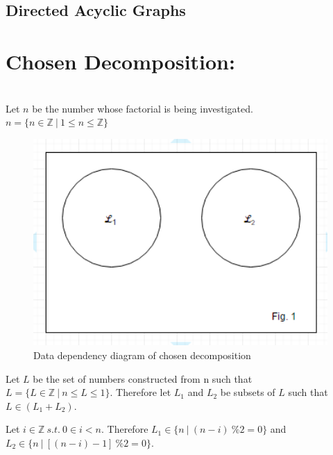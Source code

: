 \documentclass[11pt]{article}
\begin{document}
\begin{page}

\clearpage
\setcounter{page}{1}

\section{Directed Acyclic Graphs}
\noindent \chapter{Chosen Decomposition:} \\
\noindent Let $n$ be the number whose factorial is being investigated. \\
$ n = \{ n \in \mathbb{Z}\ |\ 1 \leq n \leq \mathbb{Z}\} $ 
\\

\begin{figure}
\centering
     \includegraphics[width=1.0\textwidth]{parallel_fig1}\\
     Data dependency diagram of chosen decomposition
\end{figure}
\noindent Let $L$ be the set of numbers constructed from n such that $L = \{ L \in \mathbb{Z}\ |\ n \leq L \leq 1\}$.
Therefore let $L_1$ and $L_2$ be subsets of $L$ such that $L \in (L_1 + L_2) $.

\noindent Let $i \in \mathbb{Z} \ s.t. \ 0 \in i < n$.
Therefore $L_1 \in \{ n\ |\ (n - i)\ \%2 = 0 \}$ and $L_2 \in \{ n\ |\ [(n - i) - 1]\ \%2 = 0 \}$.\\\\



\end{page}
\end{document}

